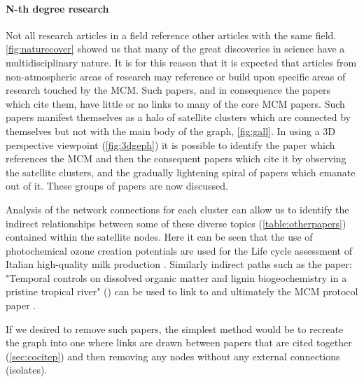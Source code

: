  

\paragraph*{N-th degree research}
Not all research articles in a field reference other articles with the same field. \autoref{fig:naturecover} showed us that many of the great discoveries in science have a multidisciplinary nature. It is for this reason that it is expected that articles from non-atmospheric areas of research may reference or build upon specific areas of research touched by the MCM. Such papers, and in consequence the papers which cite them, have little or no links to many of the core MCM papers. Such papers manifest themselves as a halo of satellite clusters which are connected by themselves but not with the main body of the graph, \autoref{fig:gall}. In using a 3D perspective viewpoint (\autoref{fig:3dgeph}) it is possible to identify the paper which references the MCM and then the consequent papers which cite it by observing the satellite clusters, and the gradually lightening spiral of papers which emanate out of it. These groups of papers are now discussed. 

Analysis of the network connections for each cluster can allow us to identify the indirect relationships between some of these diverse topics (\autoref{table:otherpapers}) contained within the satellite nodes. Here it can be seen that the use of photochemical ozone creation potentials \citep{milk1,milk2} are used for the Life cycle assessment of Italian high-quality milk production \citep{milk}. 
Similarly indirect paths such as the paper:
 "Temporal controls on dissolved organic matter and lignin biogeochemistry in a pristine tropical river" (\citep{biogeo}) can be used to link to \citep{georiver1} and ultimately the MCM protocol paper \citep{mcmpartA}.
 
 If we desired to remove such papers, the simplest method would be to recreate the graph into one where links are drawn between papers that are cited together (\autoref{sec:cocitep})
 and then removing any nodes without any external connections (isolates).

